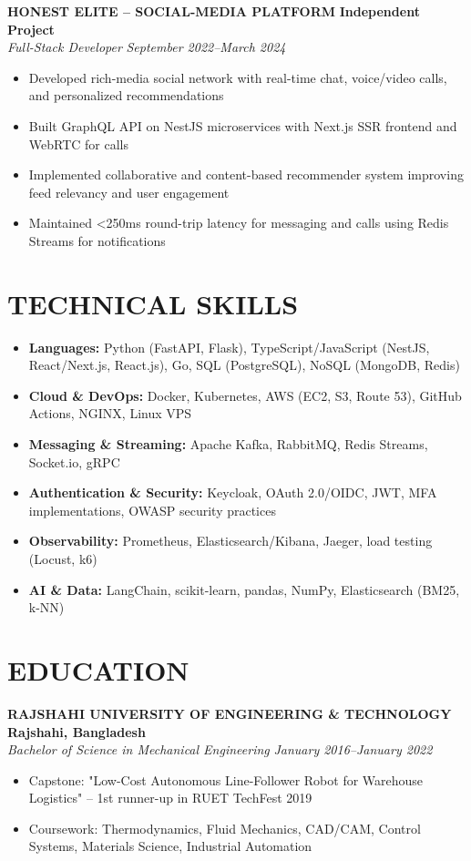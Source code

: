 \documentclass[11pt,letterpaper]{article}
\newcommand{\role}[4]{
  \begin{center}
  \textbf{#1} \hfill \textbf{#2} \\
  \textit{#3} \hfill \textit{#4}
  \end{center}
}
\begin{document}
\role{HONEST ELITE -- SOCIAL-MEDIA PLATFORM}{Independent Project}{Full-Stack Developer}{September 2022--March 2024}
\begin{itemize}[leftmargin=*,nosep,topsep=0pt]
  \item Developed rich-media social network with real-time chat, voice/video calls, and personalized recommendations
  \item Built GraphQL API on NestJS microservices with Next.js SSR frontend and WebRTC for calls
  \item Implemented collaborative and content-based recommender system improving feed relevancy and user engagement
  \item Maintained <250ms round-trip latency for messaging and calls using Redis Streams for notifications
\end{itemize}

\vspace{1em}
\section{TECHNICAL SKILLS}

\vspace{0.5em}
\begin{itemize}[leftmargin=*,nosep]
  \item \textbf{Languages:} Python (FastAPI, Flask), TypeScript/JavaScript (NestJS, React/Next.js, React.js), Go, SQL (PostgreSQL), NoSQL (MongoDB, Redis)
  \item \textbf{Cloud \& DevOps:} Docker, Kubernetes, AWS (EC2, S3, Route 53), GitHub Actions, NGINX, Linux VPS
  \item \textbf{Messaging \& Streaming:} Apache Kafka, RabbitMQ, Redis Streams, Socket.io, gRPC
  \item \textbf{Authentication \& Security:} Keycloak, OAuth 2.0/OIDC, JWT, MFA implementations, OWASP security practices
  \item \textbf{Observability:} Prometheus, Elasticsearch/Kibana, Jaeger, load testing (Locust, k6)
  \item \textbf{AI \& Data:} LangChain, scikit-learn, pandas, NumPy, Elasticsearch (BM25, k-NN)
\end{itemize}

\vspace{1em}
\section{EDUCATION}

\vspace{0.5em}
\role{RAJSHAHI UNIVERSITY OF ENGINEERING \& TECHNOLOGY}{Rajshahi, Bangladesh}{Bachelor of Science in Mechanical Engineering}{January 2016--January 2022}
\begin{itemize}[leftmargin=*,nosep,topsep=0pt]
  \item Capstone: "Low-Cost Autonomous Line-Follower Robot for Warehouse Logistics" -- 1st runner-up in RUET TechFest 2019
  \item Coursework: Thermodynamics, Fluid Mechanics, CAD/CAM, Control Systems, Materials Science, Industrial Automation
\end{itemize}
\end{document}
